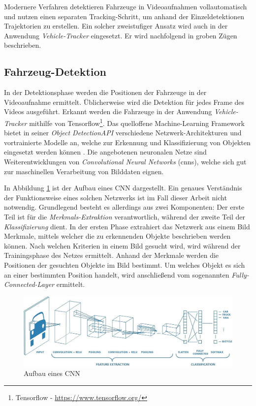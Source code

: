 Modernere Verfahren detektieren Fahrzeuge in Videoaufnahmen vollautomatisch und nutzen einen separaten
Tracking-Schritt, um anhand der Einzeldetektionen Trajektorien zu erstellen. Ein solcher zweistufiger
Ansatz wird auch in der Anwendung \textit{Vehicle-Tracker} eingesetzt. Er wird nachfolgend in groben
Zügen beschrieben.

\subsection{Fahrzeug-Detektion}

In der Detektionsphase werden die Positionen der Fahrzeuge in der Videoaufnahme ermittelt.
Üblicherweise wird die Detektion für jedes Frame des Videos ausgeführt.
Erkannt werden die Fahrzeuge in der Anwendung \textit{Vehicle-Tracker} mithilfe von Tensorflow\footnote{Tensorflow - \url{https://www.tensorflow.org/}}.
Das quelloffene Machine-Learning Framework bietet in seiner \textit{Object DetectionAPI}
verschiedene Netzwerk-Architekturen und vortrainierte Modelle an, welche zur Erkennung und Klassifizierung
von Objekten eingesetzt werden können \cite[]{Huang2018}. Die angebotenen neuronalen Netze sind Weiterentwicklungen
von \textit{Convolutional Neural Networks} (\acrshort*{cnn}s), welche sich gut zur maschinellen Verarbeitung
von Bilddaten eignen.

In Abbildung \ref{fig:grund_structure_cnn} ist der Aufbau eines CNN dargestellt.
Ein genaues Verständnis der Funktionsweise eines solchen Netzwerks ist im Fall dieser Arbeit nicht notwendig.
Grundlegend besteht es allerdings aus zwei Komponenten: Der erste Teil ist für
die \textit{Merkmals-Extraktion} verantwortlich, während der zweite Teil der \textit{Klassifizierung} dient.
In der ersten Phase extrahiert das Netzwerk aus einem Bild Merkmale, mittels
welcher die zu erkennenden Objekte beschrieben werden können. Nach welchen Kriterien in einem Bild gesucht wird,
wird während der Trainingsphase des Netzes ermittelt.
Anhand der Merkmale werden die Positionen der gesuchten Objekte im Bild bestimmt.
Um welches Objekt es sich an einer bestimmten Position handelt, wird anschließend vom sogenannten
\textit{Fully-Connected-Layer} ermittelt. \cite[]{Cornelisse2018}

\begin{figure}[H]
    \centering
    \includegraphics[width=0.95\linewidth]{resources/img/grundlagen/TrajectoryReconstruction/cnn_structure}
    \caption[Aufbau eines CNN]{Aufbau eines CNN \cite[]{PatelShyamal2017}}
    \label{fig:grund_structure_cnn}
\end{figure}

